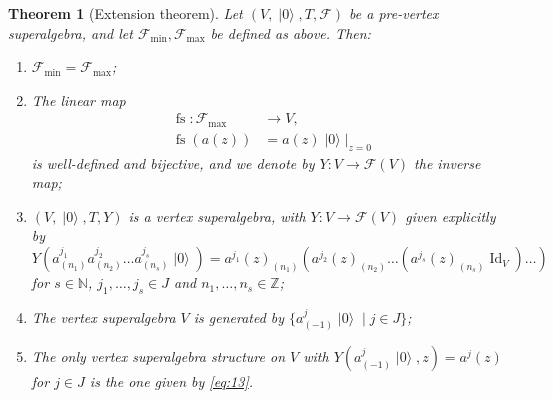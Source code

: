 \documentclass[a4paper, 12pt, reqno]{amsart}
\newtheorem{theorem}{Theorem}[section]
\theoremstyle{remark}
\DeclareMathOperator{\Id}{Id}
\DeclareMathOperator{\vac}{|0\rangle}
\DeclareMathOperator{\fs}{fs}
\begin{document}
\begin{theorem}[Extension theorem]
  \label{thr:18}
  Let $(V, \vac, T, \mathcal{F})$ be a pre-vertex superalgebra, and let $\mathcal{F}_{\min}, \mathcal{F}_{\max}$ be defined as above.
  Then:
  \begin{enumerate}
  \item $\mathcal{F}_{\min} = \mathcal{F}_{\max}$;
  \item The linear map
    \begin{align*}
      \fs: \mathcal{F}_{\max} &\to V, \\
      \fs(a(z)) &= a(z)\vac|_{z = 0}
    \end{align*}
    is well-defined and bijective, and we denote by $Y: V \to \mathcal{F}(V)$ the inverse map;
  \item $(V, \vac, T, Y)$ is a vertex superalgebra, with $Y: V \to \mathcal{F}(V)$ given explicitly by
    \begin{equation}
      \label{eq:13}
      Y(a^{j_1}_{(n_1)}a^{j_2}_{(n_2)}\dots a^{j_s}_{(n_s)}\vac) = a^{j_1}(z)_{(n_1)}(a^{j_2}(z)_{(n_2)}\dots(a^{j_s}(z)_{(n_s)}\Id_V)\dots)
    \end{equation}
    for $s \in \mathbb{N}$, $j_1, \dots, j_s \in J$ and $n_1, \dots, n_s \in \mathbb{Z}$;
  \item The vertex superalgebra $V$ is generated by $\{a^j_{(-1)}\vac \mid j \in J\}$;
  \item The only vertex superalgebra structure on $V$ with $Y(a^j_{(-1)}\vac, z) = a^j(z)$ for $j \in J$ is the one given by \eqref{eq:13}.
  \end{enumerate}
\end{theorem}
\end{document}
